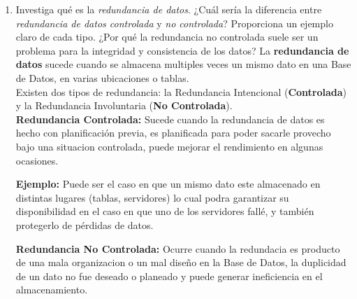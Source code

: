 \documentclass[12pt]{report}
\begin{document}
\begin{enumerate}[label=\textbf{\arabic*.}, leftmargin=*]
\begin{enumerate}[label=\textbf{\alph*.}, leftmargin=*, itemsep=1.0em]
\hspace{0.3cm}\textbf{Problemas:}
Si careciera de esto básico, entonces estarían en peligro todos los datos almacenados estando expuestos a modificaciones o eliminaciones por parte de cualquier persona/usuario que tuviera conexión a la Base de Datos.

\textbf{Recuperación;}
Es posible que el SMBD cuente con la opción de restaurar o recuperar los datos de la Base de Datos en caso de que se hubiera presentado un problema mayor y resulte en la perdida de los datos. Es recomendado siempre tener un respaldo de todos los datos para evitar cualquier percance y tener un plan de respaldo.

\hspace{0.3cm}\textbf{Problemas:}
Si no existiera está función de recuperación, es posible que cuando se presente un problema relacionado a los datos, ya sea en la modificación de los datos, migración o incluso en la perdida total, no sería posible recuperar dichos datos almacenados que pudieran ser importantes.


\item Investiga qu\'e es la \textit{redundancia de datos}. ¿Cu\'al ser\'ia la diferencia entre \textit{redundancia de datos controlada} y \textit{no controlada}? Proporciona un ejemplo claro de cada tipo. ¿Por qu\'e la redundancia no controlada suele ser un problema para la integridad y consistencia de los datos?
La \textbf{redundancia de datos} sucede cuando se almacena multiples veces un mismo dato en una Base de Datos, en varias ubicaciones o tablas.\\
Existen dos tipos de redundancia: la Redundancia Intencional (\textbf{Controlada}) y la Redundancia Involuntaria (\textbf{No Controlada}).\\
\textbf{Redundancia Controlada:} Sucede cuando la redundancia de datos es hecho con planificación previa, es planificada para poder sacarle provecho bajo una situacion controlada, puede mejorar el rendimiento en algunas ocasiones.

 \hspace{0.3cm}\textbf{Ejemplo:} Puede ser el caso en que un mismo dato este almacenado en distintas lugares (tablas, servidores) lo cual podra garantizar su disponibilidad  en el caso en que uno de los servidores fallé, y también protegerlo de pérdidas de datos.

\textbf{Redundancia No Controlada:} Ocurre cuando la redundacia es producto de una mala organizacion o un mal diseño en la Base de Datos, la duplicidad de un dato no fue deseado o planeado y puede generar ineficiencia en el almacenamiento.


\end{enumerate}
\end{enumerate}
\end{document}

